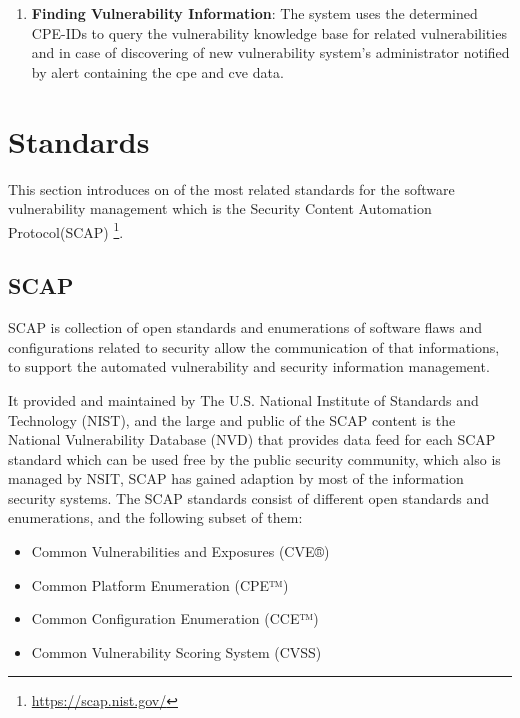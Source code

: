 \documentclass{llncs}
\begin{document}
\begin{enumerate}
   \item \textbf{Finding Vulnerability Information}: The system uses the determined CPE-IDs to query the vulnerability knowledge base for related vulnerabilities and in case of discovering of new vulnerability system's administrator notified by alert containing the cpe and cve data.      
   
 
 \end{enumerate}



\section{Standards}
This section introduces on of the most related standards for the software vulnerability management which is the Security Content Automation Protocol(SCAP) \footnote{\url{https://scap.nist.gov/}}.


\subsection{SCAP}

\par SCAP is collection of open standards and enumerations of software flaws and configurations related to security allow the communication of that informations, to support the automated vulnerability and security information management. \par   
 It provided and maintained by The U.S. National Institute of Standards and Technology (NIST)\cite{nsit}, and the large and public of the SCAP content is the National Vulnerability Database (NVD)\cite{nvd} that provides data feed for each SCAP standard which can be used free by the public security community, which also is managed by NSIT, SCAP has gained adaption by most of the information security systems.  
 The SCAP standards consist of different open standards and enumerations, and the following subset of them:
 
 \begin{itemize}
 \item Common Vulnerabilities and Exposures (CVE®)
 \item Common Platform Enumeration (CPE™)
 \item  Common Configuration Enumeration (CCE™)
 \item Common Vulnerability Scoring System (CVSS)
 \end{itemize}
 
\end{document}
